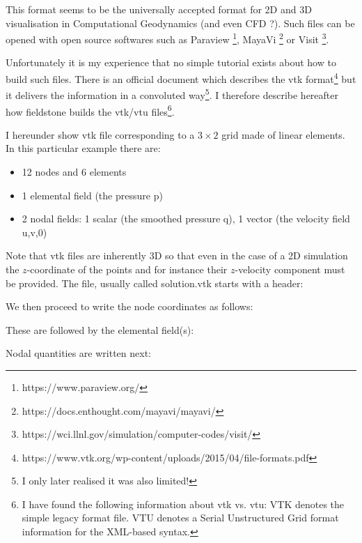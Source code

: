 
This format seems to be the universally accepted format for 2D and 3D visualisation in 
Computational Geodynamics (and even CFD ?). Such files can be opened with open source 
softwares such as 
Paraview \footnote{https://www.paraview.org/}, 
MayaVi \footnote{https://docs.enthought.com/mayavi/mayavi/}
or Visit \footnote{https://wci.llnl.gov/simulation/computer-codes/visit/}.

Unfortunately it is my experience that no simple tutorial exists about how to build 
such files. There is an official document which describes the vtk 
format\footnote{https://www.vtk.org/wp-content/uploads/2015/04/file-formats.pdf}
but it delivers the information in a convoluted way\footnote{I only later realised
it was also limited!}. I therefore describe hereafter 
how fieldstone builds the vtk/vtu files\footnote{I have found the following
information about vtk vs. vtu: VTK denotes the simple legacy format file.
VTU denotes a Serial Unstructured Grid format information for the XML-based syntax.}. 

I hereunder show vtk file corresponding to a $3\times 2$ grid made of linear elements.
In this particular example there are:
\begin{itemize}
\item 12 nodes and 6 elements
\item 1 elemental field (the pressure {\python p})
\item 2 nodal fields: 1 scalar (the smoothed pressure {\python q}), 
1 vector (the velocity field {\python u,v,0})
\end{itemize}
Note that vtk files are inherently 3D so that even in the case of 
a 2D simulation the $z$-coordinate 
of the points and for instance their $z$-velocity component must be provided.
The file, usually called {\filenamefont solution.vtk} starts with a header:



We then proceed to write the node coordinates as follows:



These are followed by the elemental field(s):



Nodal quantities are written next:



